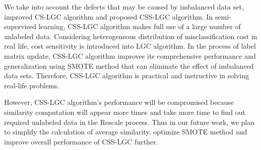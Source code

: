 \documentclass{svjour3}                     %
\begin{document}
We take into account the defects that may be caused by imbalanced data set, improved CS-LGC
algorithm and proposed CSS-LGC algorithm. In semi-supervised learning, CSS-LGC algorithm makes full use of a large number of unlabeled data. Considering heterogeneous distribution of misclassification
cost in real life, cost sensitivity is introduced into LGC algorithm. In the process of label matrix update, CSS-LGC algorithm improves its comprehensive performance and generalization using SMOTE method that can eliminate the effect of imbalanced data sets. Therefore, CSS-LGC algorithm is practical and instructive in solving real-life problems.

However, CSS-LGC algorithm's performance will be compromised because similarity computation will appear more times and take more time to find out required unlabeled data in the Rescale process. Thus in our future work, we plan to simplify the calculation of average similarity, optimize SMOTE method and improve overall performance of CSS-LGC further.



\end{document}
